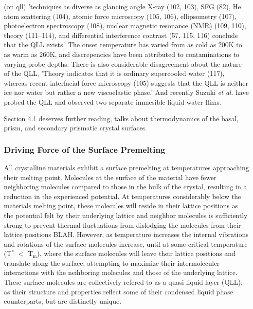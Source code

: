 (on qll) 'techniques as diverse as glancing angle X-ray (102, 103),
SFG (82), He atom scattering (104), atomic force microscopy (105,
106), ellipsometry (107), photoelectron spectroscopy (108), nuclear
magnetic resonance (NMR) (109, 110), theory (111–114), and
differential interference contrast (57, 115, 116) conclude that the
QLL exists.' The onset temperature has varied from as cold as 200K to
as warm as 260K, and discrepencies have been attributed to
contaminations to varying probe depths. There is also considerable
disagreement about the nature of the QLL, 'Theory indicates that it is
ordinary supercooled water (117), whereas recent interfacial force
microscopy (105) suggests that the QLL is neither ice nor water but
rather a new viscoelastic phase.' And recently Suzuki \textit{et al.}
have probed the QLL and observed two separate immesible liquid water
flims. 


Section 4.1 deserves further reading, talks about thermodynamics of
the basal, prism, and secondary prismatic crystal surfaces.



\subsubsection{Driving Force of the Surface Premelting}
All crystalline materials exhibit a surface premelting at temperatures
approaching their melting point. Molecules at the surface of the
material have fewer neighboring molecules compared to those in the
bulk of the crystal, resulting in a reduction in the experienced
potential. At temperatures considerably below the materials melting
point, these molecules will reside in their lattice positions as the
potential felt by their underlying lattice and neighbor molecules is
sufficiently strong to prevent thermal fluctuations from dislodging
the molecules from their lattice positions BLAH. However, as
temperature increases the internal vibrations and rotations of the
surface molecules increase, until at some critical temperature
(T$^\mathrm{*}$ $<$ T$_\mathrm{m}$), where the surface molecules will
leave their lattice positions and translate along the surface,
attempting to maximize their intermoleculer interactions with the
neihboring molecules and those of the underlying lattice. These
surface molecules are collectively refered to as a quasi-liquid layer
(QLL), as their structure and properties reflect some of their
condensed liquid phase counterparts, but are distinctly unique.

